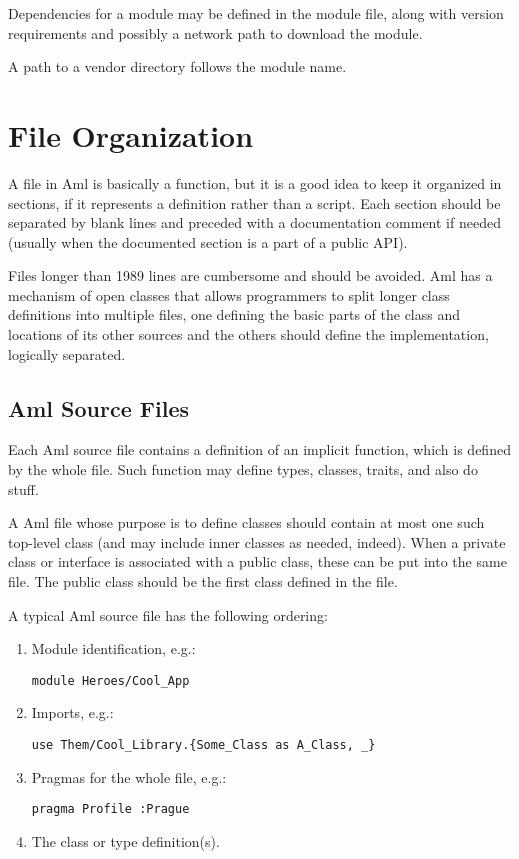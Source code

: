 Dependencies for a module may be defined in the module file, along with version requirements and possibly a network path to download the module. 

A path to a vendor directory follows the module name. 





\section{File Organization}

A file in Aml is basically a function, but it is a good idea to keep it organized in sections, if it represents a definition rather than a script. Each section should be separated by blank lines and preceded with a documentation comment if needed (usually when the documented section is a part of a public API). 

Files longer than 1989 lines are cumbersome and should be avoided. Aml has a mechanism of open classes that allows programmers to split longer class definitions into multiple files, one defining the basic parts of the class and locations of its other sources and the others should define the implementation, logically separated. 





\subsection{Aml Source Files}

Each Aml source file contains a definition of an implicit function, which is defined by the whole file. Such function may define types, classes, traits, and also do stuff. 

A Aml file whose purpose is to define classes should contain at most one such top-level class (and may include inner classes as needed, indeed). When a private class or interface is associated with a public class, these can be put into the same file. The public class should be the first class defined in the file. 

A typical Aml source file has the following ordering: 
\begin{enumerate}
\item Module identification, e.g.:
\begin{lstlisting}
module Heroes/Cool_App
\end{lstlisting}

\item Imports, e.g.:
\begin{lstlisting}
use Them/Cool_Library.{Some_Class as A_Class, _}
\end{lstlisting}

\item Pragmas for the whole file, e.g.:
\begin{lstlisting}
pragma Profile :Prague
\end{lstlisting}

\item The class or type definition(s). 
\end{enumerate}






